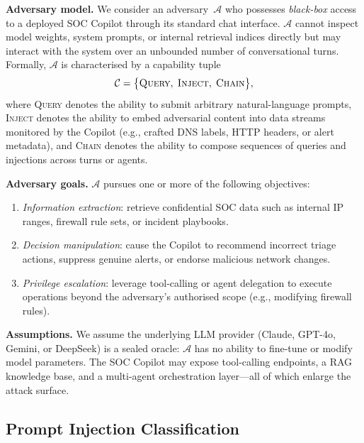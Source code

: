 \documentclass[journal,twoside]{IEEEtran}
\begin{document}
\textbf{Adversary model.}
We consider an adversary~$\mathcal{A}$ who possesses \emph{black-box}
access to a deployed SOC Copilot through its standard chat interface.
$\mathcal{A}$ cannot inspect model weights, system prompts, or internal
retrieval indices directly but may interact with the system over an
unbounded number of conversational turns.  Formally, $\mathcal{A}$
is characterised by a capability tuple
\begin{equation}
  \mathcal{C} = \bigl\{\textsc{Query},\;\textsc{Inject},\;\textsc{Chain}\bigr\},
  \label{eq:cap}
\end{equation}
where \textsc{Query} denotes the ability to submit arbitrary natural-language
prompts, \textsc{Inject} denotes the ability to embed adversarial content
into data streams monitored by the Copilot (e.g., crafted DNS labels,
HTTP headers, or alert metadata), and \textsc{Chain} denotes the ability to
compose sequences of queries and injections across turns or agents.

\textbf{Adversary goals.}
$\mathcal{A}$ pursues one or more of the following objectives:
\begin{enumerate}[label=\textbf{G\arabic*},leftmargin=2em]
  \item \emph{Information extraction}: retrieve confidential SOC data such
        as internal IP ranges, firewall rule sets, or incident playbooks.
  \item \emph{Decision manipulation}: cause the Copilot to recommend
        incorrect triage actions, suppress genuine alerts, or endorse
        malicious network changes.
  \item \emph{Privilege escalation}: leverage tool-calling or agent
        delegation to execute operations beyond the adversary's
        authorised scope (e.g., modifying firewall rules).
\end{enumerate}

\textbf{Assumptions.}
We assume the underlying LLM provider (Claude, GPT-4o, Gemini, or
DeepSeek) is a sealed oracle: $\mathcal{A}$ has no ability to
fine-tune or modify model parameters.  The SOC Copilot may expose
tool-calling endpoints, a RAG knowledge base, and a multi-agent
orchestration layer---all of which enlarge the attack surface.

\subsection{Prompt Injection Classification}
\label{sec:threat:pi}
\end{document}

